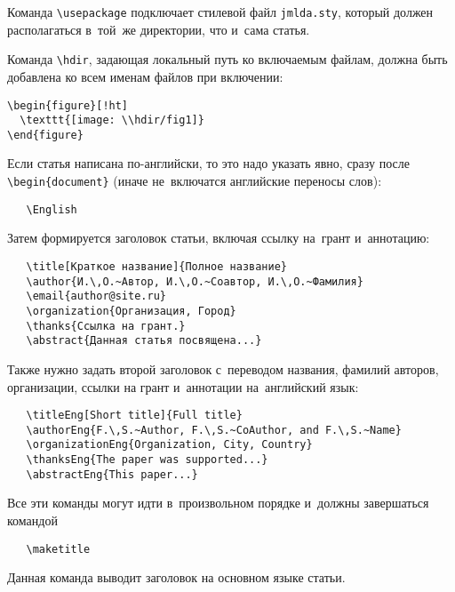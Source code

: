\documentclass[12pt, twoside]{article}
\newcommand{\hdir}{.}
\begin{document}
Команда \verb'\usepackage' подключает стилевой файл \verb'jmlda.sty',
который должен располагаться в~той~же директории, что и~сама статья.

Команда \verb'\hdir', задающая локальный путь ко включаемым файлам, должна быть добавлена ко всем именам файлов при включении:
{\small
\begin{verbatim}
\begin{figure}[!ht]
  \texttt{[image: \\hdir/fig1]}
\end{figure}
\end{verbatim}
}

Если статья написана по-английски, то это надо указать явно,
сразу после \verb|\begin{document}|
(иначе не~включатся английские переносы слов):
{\small\begin{verbatim}
   \English
\end{verbatim}}

Затем формируется заголовок статьи, включая ссылку на~грант и~аннотацию:
{\small\begin{verbatim}
   \title[Краткое название]{Полное название}
   \author{И.\,О.~Автор, И.\,О.~Соавтор, И.\,О.~Фамилия}
   \email{author@site.ru}
   \organization{Организация, Город}
   \thanks{Ссылка на грант.}
   \abstract{Данная статья посвящена...}
\end{verbatim}}

Также нужно задать второй заголовок
с~переводом названия, фамилий авторов, организации, ссылки на грант и~аннотации на~английский язык:
{\small\begin{verbatim}
   \titleEng[Short title]{Full title}
   \authorEng{F.\,S.~Author, F.\,S.~CoAuthor, and F.\,S.~Name}
   \organizationEng{Organization, City, Country}
   \thanksEng{The paper was supported...}
   \abstractEng{This paper...}
\end{verbatim}}


Все эти команды  могут идти в~произвольном порядке и~должны завершаться командой
{\small\begin{verbatim}
   \maketitle
\end{verbatim}}
Данная команда выводит заголовок на основном языке статьи.
\end{document}
